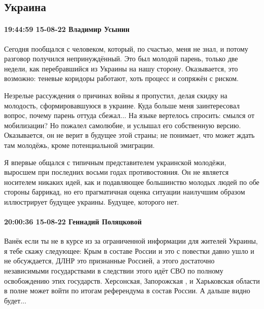  
 
 
 
 

\subsection{Украина}

\paragraph{19:44:59 15-08-22 Владимир Усынин}

Сегодня пообщался с человеком, который, по счастью, меня не знал, и потому
разговор получился непринуждённый. Это был молодой парень, только две недели,
как перебравшийся из Украины на нашу сторону. Оказывается, это возможно:
теневые коридоры работают, хоть процесс и сопряжён с риском.

Незрелые рассуждения о причинах войны я пропустил, делая скидку на молодость,
сформировавшуюся в украине. Куда больше меня заинтересовал вопрос, почему
парень оттуда сбежал... На языке вертелось спросить: смылся от мобилизации? Но
пожалел самолюбие, и услышал его собственную версию. Оказывается, он не верит в
будущее этой страны; не понимает, что может ждать там молодёжь, кроме
потенциальной эмиграции.

Я впервые общался с типичным представителем украинской молодёжи, выросшем при
последних восьми годах противостояния. Он не является носителем никаких идей,
как и подавляющее большинство молодых людей по обе стороны баррикад, но его
прагматичная оценка ситуации наилучшим образом иллюстрирует будущее украины.
Будущее, которого нет.

\paragraph{20:00:36 15-08-22 Геннадий Поляцковой}

Ванёк если ты не в курсе из за ограниченной информации для жителей Украины, я
тебе скажу следующее: Крым в составе России и это с повестки давно ушло и не
обсуждается, ДЛНР это признанные Россией, а этого достаточно независимыми
государствами в следствии этого идёт СВО по полному освобождению этих
государств. Херсонская, Запорожская , и Харьковская области в полне может войти
по итогам референдума в состав России. А дальше видно будет...

